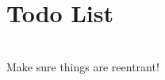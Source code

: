\chapter{Todo List }
\hypertarget{todo}{}\label{todo}

\begin{DoxyRefList}
\item[{\parbox[t]{\linewidth}{Member \doxylink{statemachine__helpers_8h_a0fd9fffa7220be645f605ad41a23551f}{Show1\+Liner} (const unsigned char \texorpdfstring{$\ast$}{*}text0)}}]\hfill \\
\label{todo__todo000001}%
%
Make sure things are reentrant! 
\end{DoxyRefList}
